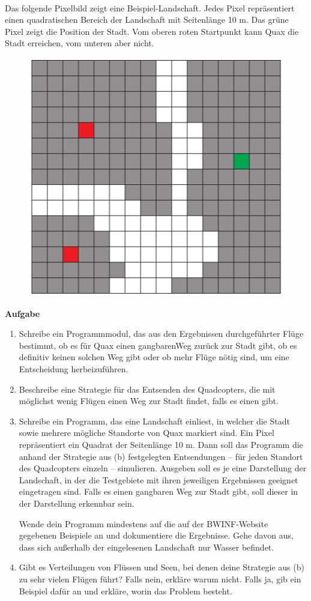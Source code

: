 \documentclass[a4paper,12pt]{article}
\begin{document}
\\[0.4cm]
Das folgende Pixelbild zeigt eine Beispiel-Landschaft. Jedes Pixel repräsentiert einen quadratischen
Bereich der Landschaft mit Seitenlänge 10 m. Das grüne Pixel zeigt die Position der
Stadt. Vom oberen roten Startpunkt kann Quax die Stadt erreichen, vom unteren aber nicht.
\begin{figure}[H]
\centering
    \includegraphics[width=0.4\linewidth]{Bilder/Aufgabe3/Aufgabenstellung_01.png}
\end{figure}
\begin{large}
    \textbf{Aufgabe} \\
\end{large}
\vspace{-0.6cm}
\begin{enumerate}[label=(\emph{\alph*})]
\item Schreibe ein Programmmodul, das aus den Ergebnissen durchgeführter Flüge bestimmt,
ob es für Quax einen gangbarenWeg zurück zur Stadt gibt, ob es definitiv keinen solchen
Weg gibt oder ob mehr Flüge nötig sind, um eine Entscheidung herbeizuführen.
\item Beschreibe eine Strategie für das Entsenden des Quadcopters, die mit möglichst wenig
Flügen einen Weg zur Stadt findet, falls es einen gibt.
\item Schreibe ein Programm, das eine Landschaft einliest, in welcher die Stadt sowie mehrere
mögliche Standorte von Quax markiert sind. Ein Pixel repräsentiert ein Quadrat der
Seitenlänge 10 m. Dann soll das Programm die anhand der Strategie aus (b) festgelegten
Entsendungen – für jeden Standort des Quadcopters einzeln – simulieren. Ausgeben soll
es je eine Darstellung der Landschaft, in der die Testgebiete mit ihren jeweiligen Ergebnissen
geeignet eingetragen sind. Falls es einen gangbaren Weg zur Stadt gibt, soll dieser
in der Darstellung erkennbar sein.

Wende dein Programm mindestens auf die auf der BWINF-Website gegebenen Beispiele
an und dokumentiere die Ergebnisse. Gehe davon aus, dass sich außerhalb der eingelesenen
Landschaft nur Wasser befindet.
\item Gibt es Verteilungen von Flüssen und Seen, bei denen deine Strategie aus (b) zu sehr
vielen Flügen führt? Falls nein, erkläre warum nicht. Falls ja, gib ein Beispiel dafür an
und erkläre, worin das Problem besteht.
\end{enumerate}
\end{document}
